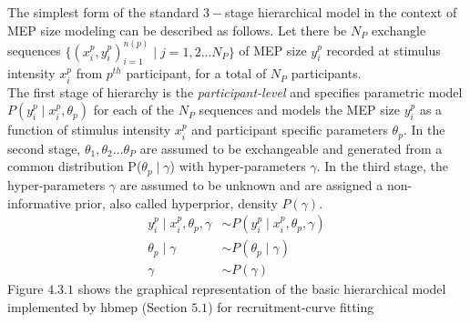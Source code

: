 \documentclass[a4paper,12pt]{article}
\begin{document}
The simplest form of the standard $3-$stage hierarchical model in the context of MEP size modeling can be described as follows. Let there be $N_P$ exchangle sequences $\{(x_i^p, y_i^p)_{i=1}^{n(p)} \mid j = 1, 2 \ldots N_P\}$ of MEP size $y_i^p$ recorded at stimulus intensity $x_i^p$ from $p^{th}$ participant, for  a total of $N_P$ participants.\\

The first stage of hierarchy is the \textit{participant-level} and specifies parametric model $P(y_i^p \mid x_i^p, \theta_p)$ for each of the $N_P$ sequences and models the MEP size $y_i^p$ as a function of stimulus intensity $x_i^p$ and participant specific parameters $\theta_p$. In the second stage, $\theta_1, \theta_2 \ldots \theta_P$ are  assumed to be exchangeable and generated from  a common distribution P($\theta_p \mid \gamma$) with hyper-parameters $\gamma$. In the third stage, the hyper-parameters $\gamma$ are assumed to be unknown and are assigned a non-informative prior, also called hyperprior, density $P(\gamma)$.
\begin{align*}
y_i^p \mid x_i^p, \theta_p, \gamma &\sim P(y_i^p \mid x_i^p, \theta_p, \gamma) \tag{4.3.1} \\
\theta_p \mid \gamma &\sim P(\theta_p \mid \gamma) \tag{4.3.2} \\
\gamma &\sim P(\gamma) \tag{4.3.3}
\end{align*}
Figure $4.3.1$ shows the graphical representation of the basic hierarchical model implemented by hbmep (Section $5.1$) for recruitment-curve fitting\\
\end{document}
